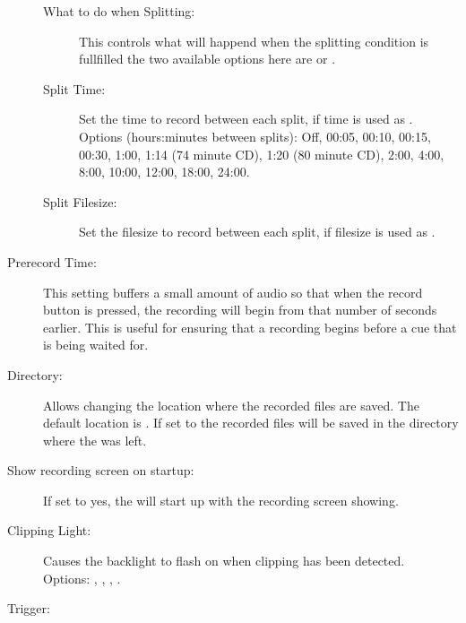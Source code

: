 \begin{description}
\begin{description}
    \item[What to do when Splitting:]
      This controls what will happend when the splitting condition is
      fullfilled the two available options here are
       or .

    \item[Split Time:]
      Set the time to record between each split, if time is used as
      .\\
      Options (hours:minutes between splits): Off, 00:05, 00:10, 00:15, 00:30,
      1:00, 1:14 (74 minute  CD), 1:20 (80 minute CD), 2:00, 4:00, 8:00, 10:00,
      12:00, 18:00, 24:00.

    \item[Split Filesize:]
      Set the filesize to record between each split, if filesize is used as
      .

  \end{description}

  \item[Prerecord Time:]
    This setting buffers a small amount of audio so that when the record button
    is pressed, the recording will begin from that number of seconds earlier.
    This is useful for ensuring that a recording begins before a cue that is
    being waited for.

  \item[Directory:]
    Allows changing the location where the recorded files are saved. The
    default location is . If set to
     the recorded files will be saved in the
    directory where the  was left.

  \item[Show recording screen on startup:]
    If set to yes, the \dap{} will start up with the recording screen showing.
      
  \item[Clipping Light:]
    Causes the backlight to flash on when clipping has been detected.\\
    Options: , ,
    , .

  \item[Trigger:]

\end{description}
